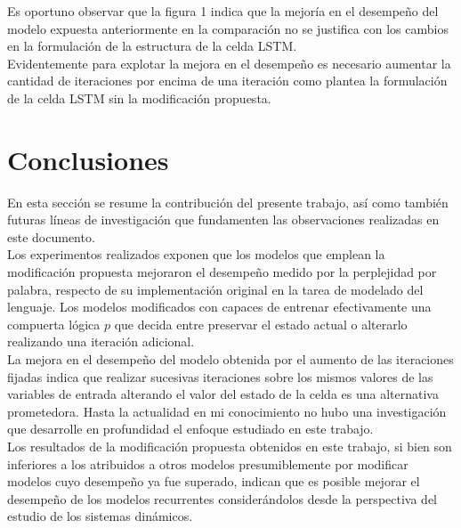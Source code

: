 \documentclass{article}
\begin{document}
	Es oportuno observar que la figura 1  indica que la mejoría en el desempeño del modelo expuesta anteriormente en la comparación no se justifica con los cambios en la formulación de la estructura de la celda LSTM. \\
	Evidentemente para explotar la mejora en el desempeño es necesario aumentar la cantidad de iteraciones por encima de una iteración como plantea la formulación de la celda LSTM sin la modificación propuesta.\\
	
	\section{Conclusiones}\label{sectionConclusions}
	En esta sección se resume la contribución del presente trabajo, así como también futuras líneas de investigación que fundamenten las observaciones realizadas en este documento.\\
	
	Los experimentos realizados exponen que los modelos que emplean la modificación propuesta mejoraron el desempeño medido por la perplejidad por palabra, respecto de su implementación original en la tarea de modelado del lenguaje. Los modelos modificados con capaces de entrenar efectivamente una compuerta lógica $p$ que decida entre preservar el estado actual o alterarlo realizando una iteración adicional.\\
	
	La mejora en el desempeño del modelo obtenida por el aumento de las iteraciones fijadas indica que realizar sucesivas iteraciones sobre los mismos valores de las variables de entrada alterando el valor del estado de la celda es una alternativa prometedora. Hasta la actualidad en mi conocimiento no hubo una investigación que desarrolle en profundidad el enfoque estudiado en este trabajo.\\
	
	Los resultados de la modificación propuesta obtenidos en este trabajo, si bien son inferiores a los atribuidos a otros modelos\cite{14RegularizationZaremba} presumiblemente por modificar modelos cuyo desempeño ya fue superado, indican que es posible mejorar el desempeño de los modelos recurrentes considerándolos desde la perspectiva del estudio de los sistemas dinámicos.
	
\end{document}
